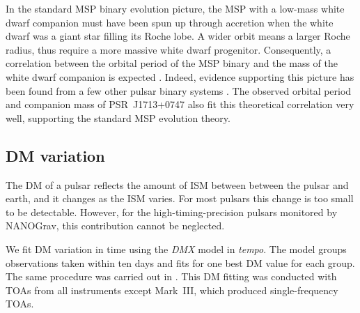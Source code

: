 In the standard MSP binary evolution picture, the MSP with a low-mass white dwarf companion must have been spun up through
accretion when the white dwarf was a giant star filling its Roche lobe. A wider
orbit means a larger Roche radius, thus require a more massive white dwarf 
progenitor.
Consequently, a correlation between the orbital period
of the MSP binary and the mass of the white dwarf companion is expected \citep{rpj+95, ts99a, prp02b}. 
Indeed, evidence supporting this picture has been found from a few other pulsar
binary systems \citep[e.g.,][]{vbb+01, ktr94, th14}.  
The observed  orbital period and companion mass of PSR~J1713+0747 also fit this theoretical correlation very well, supporting the standard MSP evolution theory. %




\subsection{DM variation}
\label{sec:dmx}
The DM of a pulsar reflects the amount of ISM between
between the pulsar and earth, and it changes as the ISM varies. For most pulsars
this change is too small to be detectable. However, for the
high-timing-precision pulsars monitored by NANOGrav, this contribution cannot be 
neglected.

We fit DM variation in time using the {\it DMX} model in {\it tempo}.
The model groups observations taken within ten days and fits for one
best DM value for each group.  The same procedure was carried out in
\citealt{dfg+13}.  This DM fitting was conducted with TOAs from all
instruments except Mark~III, which produced single-frequency TOAs.

